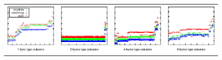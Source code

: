 \begin{figure}[t]
\begin{tabular}{cccc}
\includegraphics{figs/static/storagetime_rpp64}&\includegraphics{figs/static/storagetime_rpp32}&\includegraphics{figs/static/storagetime_rpp16}&\includegraphics{figs/static/storagetime_rpp8}

\end{tabular}
\end{figure}
